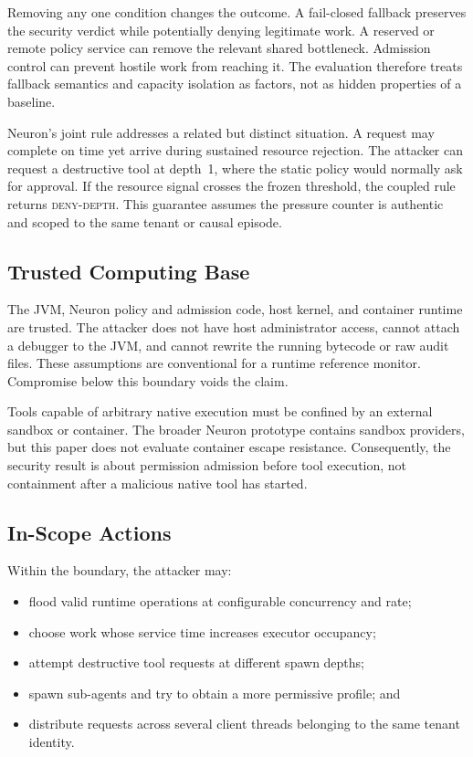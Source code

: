 Removing any one condition changes the outcome. A fail-closed fallback
preserves the security verdict while potentially denying legitimate work. A
reserved or remote policy service can remove the relevant shared bottleneck.
Admission control can prevent hostile work from reaching it. The evaluation
therefore treats fallback semantics and capacity isolation as factors, not as
hidden properties of a baseline.

Neuron's joint rule addresses a related but distinct situation. A request
may complete on time yet arrive during sustained resource rejection. The
attacker can request a destructive tool at depth~1, where the static policy
would normally ask for approval. If the resource signal crosses the frozen
threshold, the coupled rule returns \textsc{deny-depth}. This guarantee
assumes the pressure counter is authentic and scoped to the same tenant or
causal episode.

\subsection{Trusted Computing Base}

The JVM, Neuron policy and admission code, host kernel, and container runtime
are trusted. The attacker does not have host administrator access, cannot
attach a debugger to the JVM, and cannot rewrite the running bytecode or raw
audit files. These assumptions are conventional for a runtime reference
monitor. Compromise below this boundary voids the claim.

Tools capable of arbitrary native execution must be confined by an external
sandbox or container. The broader Neuron prototype contains sandbox
providers, but this paper does not evaluate container escape resistance.
Consequently, the security result is about permission admission before tool
execution, not containment after a malicious native tool has started.

\subsection{In-Scope Actions}

Within the boundary, the attacker may:

\begin{itemize}
  \item flood valid runtime operations at configurable concurrency and rate;
  \item choose work whose service time increases executor occupancy;
  \item attempt destructive tool requests at different spawn depths;
  \item spawn sub-agents and try to obtain a more permissive profile; and
  \item distribute requests across several client threads belonging to the
  same tenant identity.
\end{itemize}

